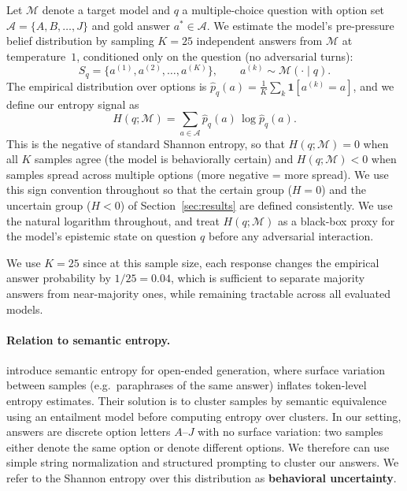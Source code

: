 Let $\mathcal{M}$ denote a target model and $q$ a multiple-choice question
with option set $\mathcal{A} = \{A, B, \ldots, J\}$ and gold answer
$a^* \in \mathcal{A}$. We estimate the model's pre-pressure belief
distribution by sampling $K = 25$ independent answers from $\mathcal{M}$
at temperature~$1$, conditioned only on the question (no adversarial
turns):
\[
S_q = \{a^{(1)}, a^{(2)}, \ldots, a^{(K)}\}, \qquad a^{(k)} \sim \mathcal{M}(\cdot \mid q).
\]
The empirical distribution over options is $\hat{p}_q(a) = \tfrac{1}{K}\sum_k \mathbf{1}[a^{(k)} = a]$,
and we define our entropy signal as
\[
H(q; \mathcal{M}) = \sum_{a \in \mathcal{A}} \hat{p}_q(a)\,\log \hat{p}_q(a).
\]
This is the negative of standard Shannon entropy, so that
$H(q;\mathcal{M}) = 0$ when all $K$ samples agree (the model is
behaviorally certain) and $H(q;\mathcal{M}) < 0$ when samples spread
across multiple options (more negative = more spread). We use this
sign convention throughout so that the certain group ($H = 0$) and
the uncertain group ($H < 0$) of Section~\ref{sec:results} are
defined consistently. We use the natural logarithm throughout, and
treat $H(q;\mathcal{M})$ as a black-box proxy for the model's
epistemic state on question $q$ before any adversarial interaction.

We use $K = 25$ since at this sample size, each response changes the empirical answer probability by $1/25 = 0.04$, which is sufficient to separate majority answers from near-majority ones, while remaining tractable across all evaluated models. 

\paragraph{Relation to semantic entropy.}
\citet{kuhn2023semanticuncertaintylinguisticinvariances} introduce
semantic entropy for open-ended generation, where surface variation
between samples (e.g.\ paraphrases of the same answer) inflates token-level
entropy estimates. Their solution is to cluster samples by semantic
equivalence using an entailment model before computing entropy over
clusters. In our setting, answers are discrete option letters $A$--$J$
with no surface variation: two samples either denote the same option or
denote different options. We therefore can use simple string normalization and structured prompting to cluster our answers. We refer to the Shannon entropy over this distribution as \textbf{behavioral uncertainty}.






